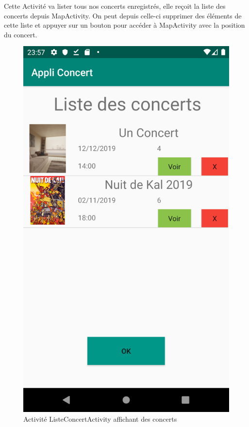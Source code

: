 \documentclass{article}
\begin{document}
Cette Activité va lister tous nos concerts enregistrés, elle reçoit la liste des concerts depuis MapActivity. On peut depuis celle-ci supprimer des éléments de cette liste et appuyer sur un bouton pour accéder à MapActivity avec la position du concert. 
\begin{figure}[h!]
\centering
\includegraphics[scale=0.13]{./img/liste.png}
\caption{Activité ListeConcertActivity affichant des concerts}
\end{figure}
\vspace{1\baselineskip}
\end{document}
